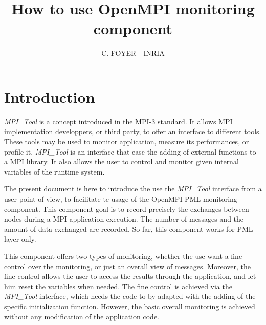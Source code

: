 \documentclass[notitlepage]{article}
\title{How to use OpenMPI monitoring component}
\author{C. FOYER - INRIA}
\newcommand{\mpit}[1]{\textit{MPI\_Tool#1}}
\begin{document}
\maketitle

\section{Introduction}

\mpit{} is a concept introduced in the MPI-3 standard. It allows MPI
implementation developpers, or third party, to offer an interface to
different tools. These tools may be used to monitor application,
measure its performances, or profile it. \mpit{} is an interface that
ease the adding of external functions to a MPI library. It also allows
the user to control and monitor given internal variables of the
runtime system.

The present document is here to introduce the use the \mpit{}
interface from a user point of view, to facilitate te usage of the
OpenMPI PML monitoring component. This component goal is to record
precisely the exchanges between nodes during a MPI application
execution. The number of messages and the amount of data exchanged are
recorded. So far, this component works for PML layer only.

This component offers two types of monitoring, whether the use want a
fine control over the monitoring, or just an overall view of
messages. Moreover, the fine control allows the user to access the
results through the application, and let him reset the variables when
needed. The fine control is achieved via the \mpit{} interface, which
needs the code to by adapted with the adding of the specific
initialization function. However, the basic overall monitoring is
achieved without any modification of the application code.
\end{document}

